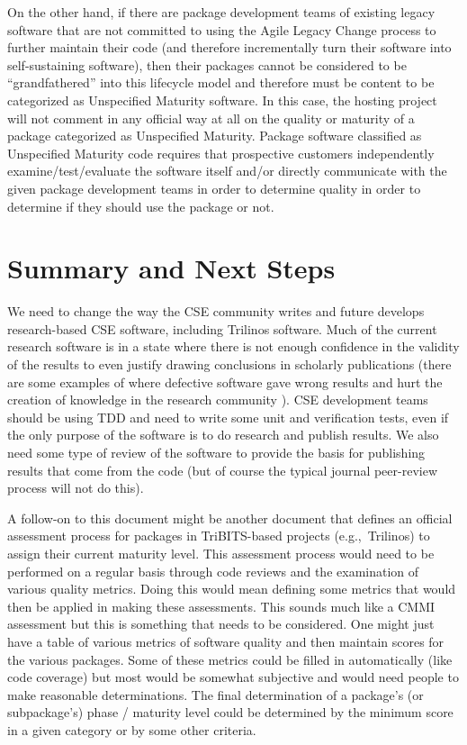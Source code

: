 \documentclass[11pt]{SANDreport}
\begin{document}
On the other hand, if there are package development teams of existing
legacy software that are not committed to using the Agile Legacy
Change process to further maintain their code (and therefore
incrementally turn their software into self-sustaining software), then
their packages cannot be considered to be ``grandfathered'' into this
lifecycle model and therefore must be content to be categorized as
Unspecified Maturity software.  In this case, the hosting project will
not comment in any official way at all on the quality or maturity of a
package categorized as Unspecified Maturity.  Package software
classified as Unspecified Maturity code requires that prospective
customers independently examine/test/evaluate the software itself
and/or directly communicate with the given package development teams
in order to determine quality in order to determine if they should use
the package or not.


%
{}\section{Summary and Next Steps}
\label{sec:summary_next_steps}
%

We need to change the way the CSE community writes and future develops
research-based CSE software, including Trilinos software.  Much of the
current research software is in a state where there is not enough
confidence in the validity of the results to even justify drawing
conclusions in scholarly publications (there are some examples of
where defective software gave wrong results and hurt the creation of
knowledge in the research community
{}\cite{ScientistsNightmareFiveRetractions2006}).  CSE development
teams should be using TDD and need to write some unit and verification
tests, even if the only purpose of the software is to do research and
publish results.  We also need some type of review of the software to
provide the basis for publishing results that come from the code (but
of course the typical journal peer-review process will not do this).

A follow-on to this document might be another document that defines an
official assessment process for packages in TriBITS-based projects
(e.g.,\ Trilinos) to assign their current maturity level.  This
assessment process would need to be performed on a regular basis
through code reviews and the examination of various quality metrics.
Doing this would mean defining some metrics that would then be applied
in making these assessments. This sounds much like a CMMI assessment
but this is something that needs to be considered.  One might just
have a table of various metrics of software quality and then maintain
scores for the various packages.  Some of these metrics could be
filled in automatically (like code coverage) but most would be
somewhat subjective and would need people to make reasonable
determinations.  The final determination of a package's (or
subpackage's) phase / maturity level could be determined by the
minimum score in a given category or by some other criteria.
\end{document}
